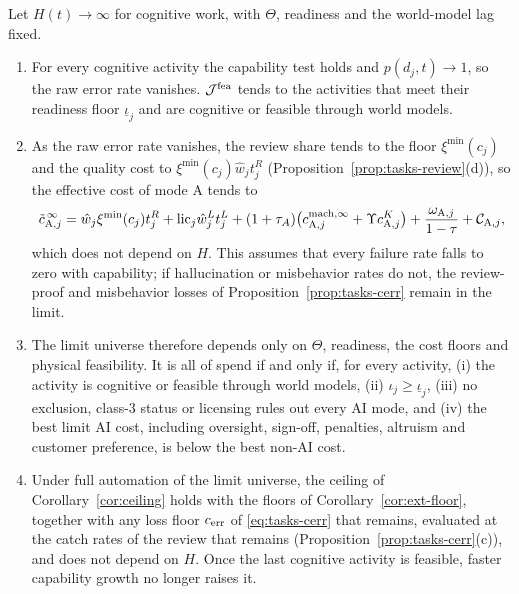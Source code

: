 \begin{proposition}\label{prop:ext-agi}
Let $H(t)\to\infty$ for cognitive work, with $\Theta$, readiness and the world-model lag fixed.
\begin{enumerate}
\item[(a)] For every cognitive activity the capability test holds and $p(d_j,t)\to1$, so the raw error rate vanishes. $\mathcal J^{\rm fea}$ tends to the activities that meet their readiness floor $\underline\iota_j$ and are cognitive or feasible through world models.
\item[(b)] As the raw error rate vanishes, the review share tends to the floor $\xi^{\min}(c_j)$ and the quality cost to $\xi^{\min}(c_j)\hat w_jt^R_j$ (Proposition~\ref{prop:tasks-review}(d)), so the effective cost of mode A tends to
\begin{equation}\label{eq:ext-cagi}
\tilde c^{\,\infty}_{\mathrm A,j}=\hat w_j\xi^{\min}(c_j)t^R_j+\mathrm{lic}_j\hat w^L_jt^L_j+(1+\tau_A)\bigl(c^{\rm mach,\infty}_{\mathrm A,j}+\Upsilon c^K_{\mathrm A,j}\bigr)+\frac{\omega_{\mathrm A,j}}{1-\tau}+\mathcal C_{\mathrm A,j},
\end{equation}
which does not depend on $H$. This assumes that every failure rate falls to zero with capability; if hallucination or misbehavior rates do not, the review-proof and misbehavior losses of Proposition~\ref{prop:tasks-cerr} remain in the limit.
\item[(c)] The limit universe therefore depends only on $\Theta$, readiness, the cost floors and physical feasibility. It is all of spend if and only if, for every activity, (i) the activity is cognitive or feasible through world models, (ii) $\iota_j\ge\underline\iota_j$, (iii) no exclusion, class-3 status or licensing rules out every AI mode, and (iv) the best limit AI cost, including oversight, sign-off, penalties, altruism and customer preference, is below the best non-AI cost.
\item[(d)] Under full automation of the limit universe, the ceiling of Corollary~\ref{cor:ceiling} holds with the floors of Corollary~\ref{cor:ext-floor}, together with any loss floor $c_{\rm err}$ of \eqref{eq:tasks-cerr} that remains, evaluated at the catch rates of the review that remains (Proposition~\ref{prop:tasks-cerr}(c)), and does not depend on $H$. Once the last cognitive activity is feasible, faster capability growth no longer raises it.
\end{enumerate}
\end{proposition}

